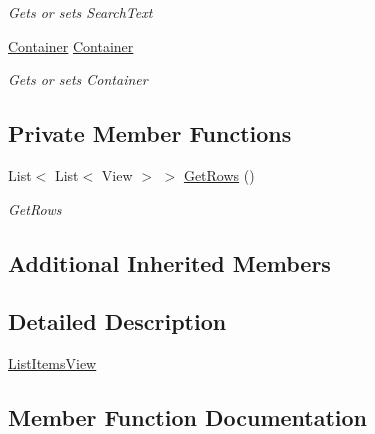 \begin{DoxyCompactItemize}
\begin{DoxyCompactList}\small\item\em Gets or sets Search\+Text \end{DoxyCompactList}\item 
\mbox{\hyperlink{class_gtd_app_1_1_data_1_1_container}{Container}} \mbox{\hyperlink{class_gtd_app_1_1_console_1_1_views_1_1_items_1_1_list_items_view_a88e5d9fe1fc5b57aac16b2eedaa16323}{Container}}
\begin{DoxyCompactList}\small\item\em Gets or sets Container \end{DoxyCompactList}\end{DoxyCompactItemize}
\subsection*{Private Member Functions}
\begin{DoxyCompactItemize}
\item 
List$<$ List$<$ View $>$ $>$ \mbox{\hyperlink{class_gtd_app_1_1_console_1_1_views_1_1_items_1_1_list_items_view_a45ca2fad9288ad43274d1d04db2c9443}{Get\+Rows}} ()
\begin{DoxyCompactList}\small\item\em Get\+Rows \end{DoxyCompactList}\end{DoxyCompactItemize}
\subsection*{Additional Inherited Members}


\subsection{Detailed Description}
\mbox{\hyperlink{class_gtd_app_1_1_console_1_1_views_1_1_items_1_1_list_items_view}{List\+Items\+View}} 



\subsection{Member Function Documentation}
\mbox{\label{class_gtd_app_1_1_console_1_1_views_1_1_items_1_1_list_items_view_af47a989ad448b41d13630ac6fc499a79}} 
